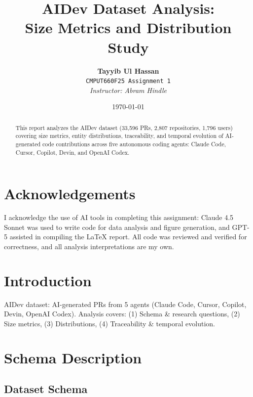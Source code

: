 \documentclass[11pt]{article}
\title{\textbf{AIDev Dataset Analysis:\\Size Metrics and Distribution Study}}
\author{
    \textbf{Tayyib Ul Hassan}\\
    \texttt{CMPUT660F25 Assignment 1}\\[0.5em]
    \textit{Instructor: Abram Hindle}
}
\date{\today}
\begin{document}
\maketitle

\begin{abstract}
This report analyzes the AIDev dataset (33,596 PRs, 2,807 repositories, 1,796 users) covering size metrics, entity distributions, traceability, and temporal evolution of AI-generated code contributions across five autonomous coding agents: Claude Code, Cursor, Copilot, Devin, and OpenAI Codex.
\end{abstract}
\newpage

\tableofcontents
\newpage

\section*{Acknowledgements}

I acknowledge the use of AI tools in completing this assignment: Claude 4.5 Sonnet was used to write code for data analysis and figure generation, and GPT-5 assisted in compiling the LaTeX report. All code was reviewed and verified for correctness, and all analysis interpretations are my own.

\newpage

\section{Introduction}

AIDev dataset: AI-generated PRs from 5 agents (Claude Code, Cursor, Copilot, Devin, OpenAI Codex). Analysis covers: (1) Schema \& research questions, (2) Size metrics, (3) Distributions, (4) Traceability \& temporal evolution.

\section{Schema Description}

\subsection{Dataset Schema}
\end{document}
